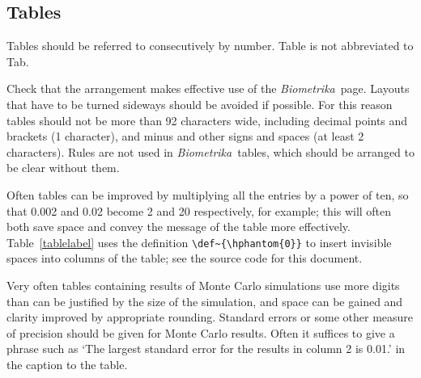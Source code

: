 \documentclass[lineno]{biometrika}
\def\Bka{{\it Biometrika}}
\begin{document}
\subsection{Tables}

Tables should be referred to consecutively by number. Table is not abbreviated to Tab.

Check that the arrangement makes effective use
of the \Bka\ page. Layouts that have to be turned sideways should be avoided
if possible. For this reason tables should not be more than 92 characters wide, including
decimal points and brackets (1 character), and minus and other signs and spaces (at least 2
characters).  Rules are not used in \Bka\ tables, which should be arranged to be clear without them.

Often tables can be improved by multiplying all the entries by a power of ten, so that 0.002 and
0.02 become 2 and 20 respectively, for example; this will often both save space and convey the message of the table more effectively. Table~\ref{tablelabel} uses the definition \verb+\def~{\hphantom{0}}+ to insert invisible spaces into columns of the table; see the source code for this document.

Very often tables containing results of Monte Carlo simulations use more digits than can be justified by the size of the simulation, and space can be gained and clarity improved by appropriate rounding.
Standard errors or some other measure of precision should be given for Monte Carlo results.
Often it suffices to give a phrase such as `The largest standard error for the results in column 2 is 0.01.' in the caption to the table.



\end{document}

